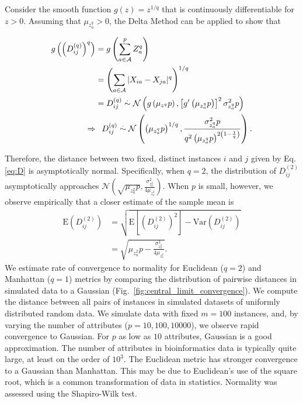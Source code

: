 \documentclass[10pt,letterpaper]{article}
\begin{document}
Consider the smooth function $g(z) = z^{1/q}$ that is continuously differentiable for $z>0$. Assuming that $\mu_{z^q_a}>0$, the Delta Method \cite{allStats} can be applied to show that 

\begin{equation}\label{eq:DqDeltaMethod}
\begin{aligned}
g\left(\left(D^{(q)}_{ij}\right)^q\right) &= g\left(\displaystyle \sum_{a \in \mathcal{A}}^{p}Z^q_a\right) \\
&= \left(\sum_{a \in \mathcal{A}} |X_{ia} - X_{ja}|^q\right)^{1/q} \\
&= D^{(q)}_{ij} \overset{.}{\sim} \mathcal{N}\left(g\left(\mu_{z^q}p\right),\left[g^\prime \left(\mu_{z^q_a}p\right)\right]^2\sigma^2_{z^q_a}p\right) \\
\Rightarrow &\hphantom{=} D^{(q)}_{ij} \overset{.}{\sim} \mathcal{N}\left(\left(\mu_{z^q_a}p\right)^{1/q},\frac{\sigma^2_{z^q_a}p}{q^2\left(\mu_{z^q_a}p\right)^{2\left(1 - \frac{1}{q}\right)}}\right).
\end{aligned}
\end{equation}

Therefore, the distance between two fixed, distinct instances $i$ and $j$ given by Eq. \ref{eq:D} is asymptotically normal.
Specifically, when $q = 2$, the distribution of $D_{ij}^{(2)}$ asymptotically approaches $\mathcal{N}\left(\sqrt{\mu_{z^2_a}p}, \frac{\sigma^2_{z^2_a}}{4\mu_{z^2_a}}\right)$. 
When $p$ is small, however, we observe empirically that a closer estimate of the sample mean is 
%
\begin{equation}\label{eq:DqImprovedExplained}
\begin{aligned}
\text{E}\left(D^{(2)}_{ij}\right) &= \sqrt{\text{E}\left[\left(D^{(2)}_{ij}\right)^2\right] - \text{Var}\left(D^{(2)}_{ij}\right)} \\
&= \sqrt{\mu_{z^2_a}p - \frac{\sigma^2_{z^2_a}}{4\mu_{z^2_a}}}.
\end{aligned}
\end{equation}
%
We estimate rate of convergence to normality for Euclidean ($q=2$) and Manhattan ($q=1$)  metrics by comparing the distribution of pairwise distances in simulated data to a Gaussian (Fig.~\ref{fig:central_limit_convergence}). We compute the distance between all pairs of instances in simulated datasets of uniformly distributed random data. We simulate data with fixed $m=100$ instances, and, by varying the number of attributes ($p=10,100,10000$), we observe rapid convergence to Gaussian. For $p$ as low as $10$ attributes, Gaussian is a good approximation. The number of attributes in bioinformatics data is typically quite large, at least on the order of $10^3$. The Euclidean metric has stronger convergence to a Gaussian than Manhattan. This may be due to Euclidean's use of the square root, which is a common transformation of data in statistics. Normality was assessed using the Shapiro-Wilk test. 
\end{document}
